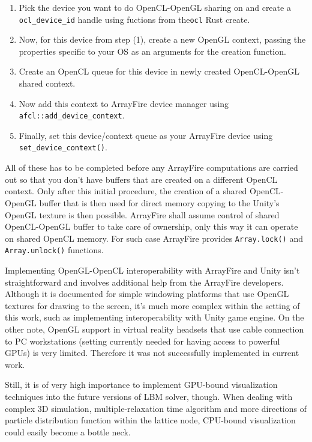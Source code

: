 \begin{enumerate}
	\item Pick the device you want to do OpenCL-OpenGL sharing on and create a \texttt{ocl_device_id} handle using fuctions from the\texttt{ocl} Rust create.
	\item Now, for this device from step (1), create a new OpenGL context, passing the properties specific to your OS as an arguments for the creation function.
	\item Create an OpenCL queue for this device in newly created OpenCL-OpenGL shared context.
	\item Now add this context to ArrayFire device manager using \texttt{afcl::add_device_context}.
	\item Finally, set this device/context queue as your ArrayFire device using \texttt{set_device_context()}.
\end{enumerate}

All of these has to be completed before any ArrayFire computations are carried out so that you don't have buffers that are created on a different OpenCL context. Only after this initial procedure, the creation of a shared OpenCL-OpenGL buffer that is then used for direct memory copying to the Unity's OpenGL texture is then possible. ArrayFire shall assume control of shared OpenCL-OpenGL buffer to take care of ownership, only this way it can operate on shared OpenCL memory. For such case ArrayFire provides 
\texttt{Array.lock()} and \texttt{Array.unlock()} functions.

Implementing OpenGL-OpenCL interoperability with ArrayFire and Unity isn't straightforward and involves additional help from the ArrayFire developers. Although it is documented for simple windowing platforms that use OpenGL textures for drawing to the screen, it's much more complex within the setting of this work, such as implementing interoperability with Unity game engine. On the other note, OpenGL support in virtual reality headsets that use cable connection to PC workstations (setting currently needed for having access to powerful GPUs) is very limited. Therefore it was not successfully implemented in current work. 

Still, it is of very high importance to implement GPU-bound visualization techniques into the future versions of LBM solver, though. When dealing with complex 3D simulation, multiple-relaxation time algorithm and more directions of particle distribution function within the lattice node, CPU-bound visualization could easily become a bottle neck.

